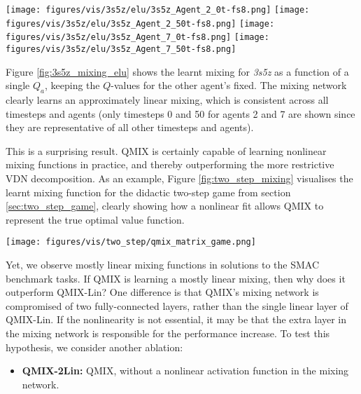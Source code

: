\documentclass[twoside,11pt]{article}
\begin{document}
\begin{figure*}[h!]
    \centering
    \texttt{[image: figures/vis/3s5z/elu/3s5z\_Agent\_2\_0t-fs8.png]}
    \texttt{[image: figures/vis/3s5z/elu/3s5z\_Agent\_2\_50t-fs8.png]}
    \texttt{[image: figures/vis/3s5z/elu/3s5z\_Agent\_7\_0t-fs8.png]}
    \texttt{[image: figures/vis/3s5z/elu/3s5z\_Agent\_7\_50t-fs8.png]}
    \caption{The learnt mixing of QMIX on \textit{3s5z} at the end of training for timesteps 0 (left) and 50 (right), for agents 2 (top) and 7 (bottom).}
    \label{fig:3s5z_mixing_elu}
\end{figure*}

Figure \ref{fig:3s5z_mixing_elu} shows the learnt mixing for \textit{3s5z} as a function of a single $Q_a$, keeping the $Q$-values for the other agent's fixed.
The mixing network clearly learns an approximately linear mixing, which is 
consistent across all timesteps and agents (only timesteps 0 and 50 for agents 
2 and 7 are shown since they are representative of all other timesteps and 
agents).

This is a surprising result. QMIX is certainly capable of learning nonlinear 
mixing functions in practice, and thereby outperforming the more restrictive 
VDN decomposition.
As an example, Figure \ref{fig:two_step_mixing} visualises the learnt mixing 
function for the didactic two-step game from section \ref{sec:two_step_game}, 
clearly showing how a nonlinear fit allows QMIX to represent the true optimal 
value function.

\begin{figure*}[h!]
	\centering
	\texttt{[image: figures/vis/two\_step/qmix\_matrix\_game.png]}
	\caption{The learnt mixing of QMIX on the two-step game from Section 
	\ref{sec:two_step_game}.}
	\label{fig:two_step_mixing}
\end{figure*}

Yet, we observe mostly linear mixing functions in solutions to the SMAC 
benchmark tasks.
If QMIX is learning a mostly linear mixing, then why does it outperform QMIX-Lin?
One difference is that QMIX's mixing network is compromised of two 
fully-connected layers, rather than the single linear layer of QMIX-Lin.
If the nonlinearity is not essential, it may be that the extra layer in the 
mixing network is responsible for the performance increase.
To test this hypothesis, we consider another ablation:

\begin{itemize}
    \item \textbf{QMIX-2Lin:} QMIX, without a nonlinear activation function in the mixing network.
\end{itemize}
\end{document}
